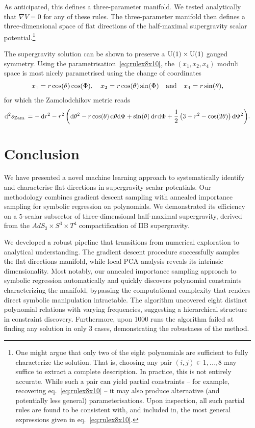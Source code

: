 \documentclass[11pt,a4paper]{article}
\renewcommand{\d}{\ensuremath{\mathrm{d}}\xspace}
\begin{document}
	As anticipated, this defines a three-parameter manifold. We tested analytically that $\nabla V = 0$ for any of these rules. The three-parameter manifold then defines a three-dimensional space of flat directions of the half-maximal supergravity scalar potential.\footnote{One might argue that only two of the eight polynomials are sufficient to fully characterize the solution. That is, choosing any pair $(i,j) \in {1, \dots, 8}$ may suffice to extract a complete description. In practice, this is not entirely accurate. While such a pair can yield partial constraints -- for example, recovering eq.~\eqref{eq:rulex8x10} -- it may also produce alternative (and potentially less general) parameterisations. Upon inspection, all such partial rules are found to be consistent with, and included in, the most general expressions given in eq.~\eqref{eq:rulex8x10}.}

	The supergravity solution can be shown to preserve a ${\rm U}(1)\times{\rm U}(1)$ gauged symmetry. Using the parametrisation~\eqref{eq:rulex8x10}, the $(x_{1},x_{2},x_{4})$ moduli space is most nicely parametrised using the change of coordinates
	\begin{equation}
		x_{1} = r\cos(\theta)\cos(\Phi), \quad x_{2} = r\cos(\theta)\sin(\Phi) \quad {\rm and} \quad x_{4} = r\sin(\theta),
	\end{equation}
	for which the Zamolodchikov metric reads
	\begin{equation}
		\d^{2}s_{\rm Zam.} = -\,\d r^{2} - r^{2}\,\bigg(\d \theta^{2} - r\cos(\theta)\,\d \theta\d\Phi + \sin(\theta)\,\d r\d\Phi + \frac{1}{2}\,\big(3+r^{2}-\cos(2\theta)\big)\,\d\Phi^{2} \bigg).
	\end{equation}

\section{Conclusion}

We have presented a novel machine learning approach to systematically identify and characterise flat directions in supergravity scalar potentials. Our methodology combines gradient descent sampling with annealed importance sampling for symbolic regression on polynomials. We demonstrated its efficiency on a 5-scalar subsector of three-dimensional half-maximal supergravity, derived from the $AdS_3 \times S^3 \times T^4$ compactification of IIB supergravity.

We developed a robust pipeline that transitions from numerical exploration to analytical understanding. The gradient descent procedure successfully samples the flat directions manifold, while local PCA analysis reveals its intrinsic dimensionality. Most notably, our annealed importance sampling approach to symbolic regression automatically and quickly discovers polynomial constraints characterizing the manifold, bypassing the computational complexity that renders direct symbolic manipulation intractable. The algorithm uncovered eight distinct polynomial relations with varying frequencies, suggesting a hierarchical structure in constraint discovery. Furthermore, upon 1000 runs the algorithm failed at finding any solution in only 3 cases, demonstrating the robustness of the method. 
\end{document}

